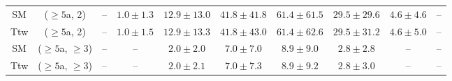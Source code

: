 \begin{table}[h!]
{\begin{tabular}{cccccccccc}
	SM & ($\ge5$a, 2) & -- & $1.0\pm 1.3$ & $12.9\pm 13.0$ & $41.8\pm 41.8$ & $61.4\pm 61.5$ & $29.5\pm 29.6$ & $4.6\pm 4.6$ & -- \\[0.5ex] 
	Ttw & ($\ge5$a, 2) & -- & $1.0\pm 1.5$ & $12.9\pm 13.3$ & $41.8\pm 43.0$ & $61.4\pm 62.6$ & $29.5\pm 31.2$ & $4.6\pm 5.0$ & -- \\[0.5ex] 
	SM & ($\ge5$a, $\ge3$) & -- & -- & $2.0\pm 2.0$ & $7.0\pm 7.0$ & $8.9\pm 9.0$ & $2.8\pm 2.8$ & -- & -- \\[0.5ex] 
	Ttw & ($\ge5$a, $\ge3$) & -- & -- & $2.0\pm 2.1$ & $7.0\pm 7.3$ & $8.9\pm 9.2$ & $2.8\pm 3.0$ & -- & -- \\[0.5ex] 
	\hline
	\hline
\end{tabular}}
\end{table}
